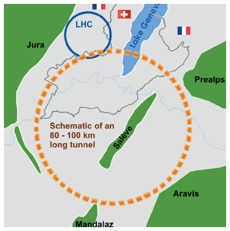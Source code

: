 \begin{frame}
\begin{columns}
    \centering
    \includegraphics[width=0.9\textwidth]{figures/FCC}

  \end{columns}

\end{frame}

